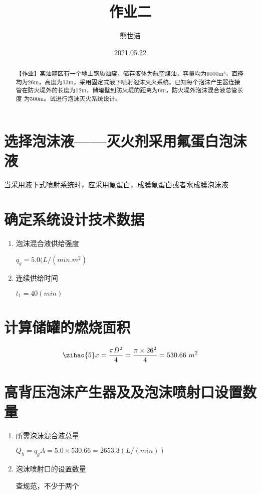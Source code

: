 \documentclass[fontset=windows]{article}
\title{\heiti\zihao{2}作业二}  %
\author{\songti 熊世洁}  %
\date{2021.05.22}  %
\newcommand{\upcite}[1]{\textsuperscript{\cite{#1}}}
\begin{document}
	\maketitle
	\thispagestyle{empty}

\begin{abstract}
【作业】某油罐区有一个地上钢质油罐，储存液体为航空煤油，容量均为6000m³，直径均为26m，高度为13m，采用固定式液下喷射泡沫灭火系统。已知每个泡沫产生器连接管在防火堤外的长度为12m，储罐壁到防火堤的距离为6m，防火堤外泡沫混合液总管长度
为500m。试进行泡沫灭火系统设计。%
\end{abstract}

\tableofcontents

\section{选择泡沫液——灭火剂采用氟蛋白泡沫液} 
当采用液下式喷射系统时，应采用氟蛋白，成膜氟蛋白或者水成膜泡沫液  \upcite{1}

\section{确定系统设计技术数据}
\begin{enumerate} %
    \item 泡沫混合液供给强度\par
{ $q_g = 5.0(  L / ( min.m^2) $ }\par
    \item  连续供给时间\par
{$t_1 = 40 (min)$}
\end{enumerate}

\section{计算储罐的燃烧面积}

\begin{equation}
{\zihao{5} x = \frac{\pi D^2}
    {4}
    =\frac{\pi \times 26^2}
    {4}
    =530.66\  m^2 }
\end{equation}

\section{高背压泡沫产生器及及泡沫喷射口设置数量}
\begin{enumerate} %
    \item 所需泡沫混合液总量\par
    { $Q_h = q_gA = 5.0 \times 530.66 = 2653.3 (  L / ( min) ) $}\par
    \item 泡沫喷射口的设置数量\par
    查规范，不少于两个  \upcite{2}
\end{enumerate}
\end{document}
